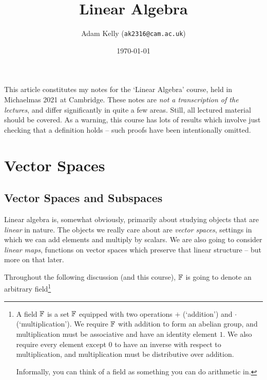 \documentclass[a4paper]{scrartcl}
\title{Linear Algebra}
\author{Adam Kelly (\texttt{ak2316@cam.ac.uk})}
\date{\today}
\begin{document}
\maketitle


This article constitutes my notes for the `Linear Algebra' course, held in Michaelmas 2021 at Cambridge. These notes are \emph{not a transcription of the lectures}, and differ significantly in quite a few areas. Still, all lectured material should be covered. As a warning, this course has lots of results which involve just checking that a definition holds -- such proofs have been intentionally omitted.


\tableofcontents

\section{Vector Spaces}

\subsection{Vector Spaces and Subspaces}

Linear algebra is, somewhat obviously, primarily about studying objects that are \emph{linear} in nature. The objects we really care about are \emph{vector spaces}, settings in which we can add elements and multiply by scalars. We are also going to consider \emph{linear maps}, functions on vector spaces which preserve that linear structure -- but more on that later. 

Throughout the following discussion (and this course), $\mathbb{F}$ is going to denote an arbitrary field\footnote{A field $\mathbb{F}$ is a set $\mathbb{F}$ equipped with two operations $+$ (`addition') and $\cdot$ (`multiplication'). We require $\mathbb{F}$ with addition to form an abelian group, and multiplication must be associative and have an identity element $1$. We also require every element except $0$ to have an inverse with respect to multiplication, and multiplication must be distributive over addition.

Informally, you can think of a field as something you can do arithmetic in.}
\end{document}
